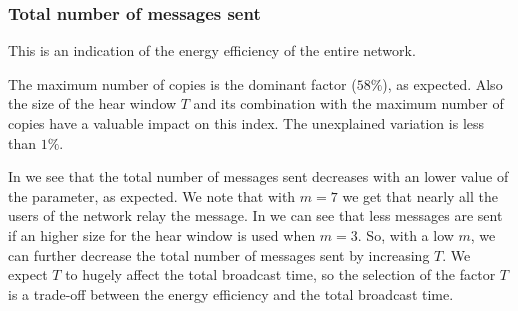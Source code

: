 \subsubsection{Total number of messages sent}\label{subsubsec:hd2krmessages}

This is an indication of the energy efficiency of the entire network.

The maximum number of copies is the dominant factor (\(58\%\)), as expected.
Also the size of the hear window \(T\) and its combination with the maximum
number of copies have a valuable impact on this index. The unexplained variation
is less than \(1\%\).

In  we see that the total number of messages sent
decreases with an lower value of the  parameter, as expected.
We note that with \(m\!=\!7\) we get that nearly all the users of the network
relay the message. In  we can see that less
messages are sent if an higher size for the hear window is used when
\(m\!=\!3\). So, with a low \(m\), we can further decrease the total number of
messages sent by increasing \(T\). We expect \(T\) to hugely affect the total
broadcast time, so the selection of the factor \(T\) is a trade-off between the
energy efficiency and the total broadcast time.

